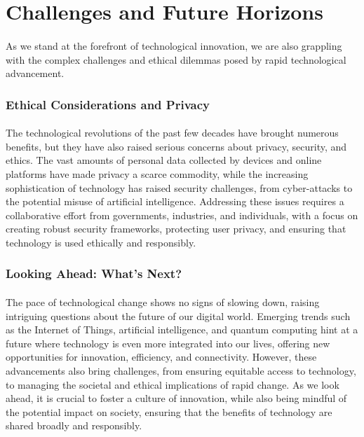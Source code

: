 \documentclass[a4paper,12pt]{book}
\begin{document}
\section*{Challenges and Future Horizons}
\paragraph{}
As we stand at the forefront of technological innovation, we are also grappling with the complex challenges and ethical dilemmas posed by rapid technological advancement.

\subsubsection*{Ethical Considerations and Privacy}
\paragraph{}
The technological revolutions of the past few decades have brought numerous benefits, but they have also raised serious concerns about privacy, security, and ethics. The vast amounts of personal data collected by devices and online platforms have made privacy a scarce commodity, while the increasing sophistication of technology has raised security challenges, from cyber-attacks to the potential misuse of artificial intelligence. Addressing these issues requires a collaborative effort from governments, industries, and individuals, with a focus on creating robust security frameworks, protecting user privacy, and ensuring that technology is used ethically and responsibly.

\subsubsection*{Looking Ahead: What’s Next?}
\paragraph{}
The pace of technological change shows no signs of slowing down, raising intriguing questions about the future of our digital world. Emerging trends such as the Internet of Things, artificial intelligence, and quantum computing hint at a future where technology is even more integrated into our lives, offering new opportunities for innovation, efficiency, and connectivity. However, these advancements also bring challenges, from ensuring equitable access to technology, to managing the societal and ethical implications of rapid change. As we look ahead, it is crucial to foster a culture of innovation, while also being mindful of the potential impact on society, ensuring that the benefits of technology are shared broadly and responsibly.
\end{document}
